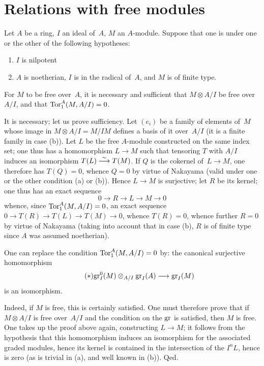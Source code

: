 \section{Relations with free modules}
\label{IV.4}

\begin{proposition}
\label{IV.4.1}
Let $A$ be a ring, $I$ an ideal of~$A$, $M$ an $A$-module. Suppose
that one is under one or the other of the following hypotheses:
\begin{enumerate}
\item[(a)] $I$ is nilpotent
\item[(b)] $A$ is noetherian, $I$ is in the radical of~$A$, and $M$ is
of finite type.
\end{enumerate}
For $M$ to be free over~$A$, it is necessary and sufficient that $M
\otimes A/I$ be free over~$A/I$, and that $\operatorname{Tor}_1^A(M,A/I) = 0$.
\end{proposition}

It is
necessary; let us prove sufficiency. Let $(e_i)$ be a family of
elements of~$M$ whose image in $M \otimes A/I = M/IM$ defines a basis
of it over~$A/I$ (it is a finite family in case (b)). Let $L$ be the
free $A$-module constructed on the same index set; one thus has a
homomorphism $L \to M$ such that tensoring $T$ with $A/I$ induces an
isomorphism $T(L) \overset{\sim}{\longrightarrow} T(M)$. If $Q$ is the cokernel of~$L \to M$,
one therefore has $T(Q) = 0$, whence $Q=0$ by virtue of Nakayama
(valid under one or the other condition (a) or (b)). Hence $L \to M$
is surjective; let $R$ be its kernel; one thus has an exact sequence
$$
0 \to R \to L \to M \to 0
$$
whence, since $\operatorname{Tor}_1^A(M,A/I)=0$, an exact sequence $0 \to T(R) \to
T(L) \to T(M) \to 0$, whence $T(R)=0$, whence further $R=0$ by virtue
of Nakayama (taking into account that in case (b), $R$ is of finite
type since $A$ was assumed noetherian).

\begin{corollary}\label{IV.4.2}
One can replace the condition $\operatorname{Tor}_1^A(M,A/I)=0$ by: the canonical
surjective homomorphism
\begin{equation*}
\label{eq:IV.2.*}
\tag{$*$} { \gr_I^0(M) \otimes_{A/I} \gr_I(A) \to \gr_I(M) }
\end{equation*}
is an isomorphism.
\end{corollary}

Indeed, if $M$ is free, this is certainly satisfied. One must
therefore prove that if $M \otimes A/I$ is free over~$A/I$ and the
condition on the $\operatorname{gr}$ is satisfied, then $M$ is free. One takes up
the proof above again, constructing $L \to M$; it follows from the
hypothesis that this homomorphism induces an isomorphism for the
associated graded modules, hence its kernel is contained in the
intersection of the $I^nL$, hence is zero (as is trivial in (a), and
well known in (b)). Qed.

